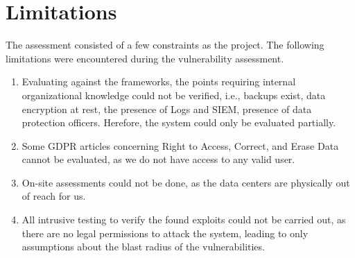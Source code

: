 \section{Limitations}
The assessment consisted of a few constraints as the project. The following limitations were encountered during the vulnerability assessment.
\begin{enumerate}
    \item Evaluating against the frameworks, the points requiring internal organizational knowledge could not be verified, i.e., backups exist, data encryption at rest, the presence of Logs and SIEM, presence of data protection officers. Herefore, the system could only be evaluated partially. 
    \item Some GDPR articles concerning Right to Access, Correct, and Erase Data cannot be evaluated, as we do not have access to any valid user. 
    \item On-site assessments could not be done, as the data centers are physically out of reach for us.
    \item All intrusive testing to verify the found exploits could not be carried out, as there are no legal permissions to attack the system, leading to only assumptions about the blast radius of the vulnerabilities.
\end{enumerate}